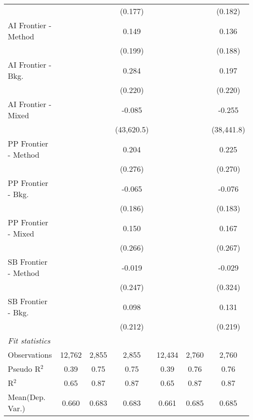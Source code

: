\begin{tabular}{lcccccc}
                        &                &         & (0.177)    &                &         & (0.182)\\   
   AI Frontier - Method &                &         & 0.149      &                &         & 0.136\\   
                        &                &         & (0.199)    &                &         & (0.188)\\   
   AI Frontier - Bkg.   &                &         & 0.284      &                &         & 0.197\\   
                        &                &         & (0.220)    &                &         & (0.220)\\   
   AI Frontier - Mixed  &                &         & -0.085     &                &         & -0.255\\   
                        &                &         & (43,620.5) &                &         & (38,441.8)\\   
   PP Frontier - Method &                &         & 0.204      &                &         & 0.225\\   
                        &                &         & (0.276)    &                &         & (0.270)\\   
   PP Frontier - Bkg.   &                &         & -0.065     &                &         & -0.076\\   
                        &                &         & (0.186)    &                &         & (0.183)\\   
   PP Frontier - Mixed  &                &         & 0.150      &                &         & 0.167\\   
                        &                &         & (0.266)    &                &         & (0.267)\\   
   SB Frontier - Method &                &         & -0.019     &                &         & -0.029\\   
                        &                &         & (0.247)    &                &         & (0.324)\\   
   SB Frontier - Bkg.   &                &         & 0.098      &                &         & 0.131\\   
                        &                &         & (0.212)    &                &         & (0.219)\\   
   \midrule
   \emph{Fit statistics}\\
   Observations         & 12,762         & 2,855   & 2,855      & 12,434         & 2,760   & 2,760\\  
   Pseudo R$^2$         & 0.39           & 0.75    & 0.75       & 0.39           & 0.76    & 0.76\\  
   R$^2$                & 0.65           & 0.87    & 0.87       & 0.65           & 0.87    & 0.87\\  
Mean(Dep. Var.) & 0.660 & 0.683 & 0.683 & 0.661 & 0.685 & 0.685 \\
   

\end{tabular}
